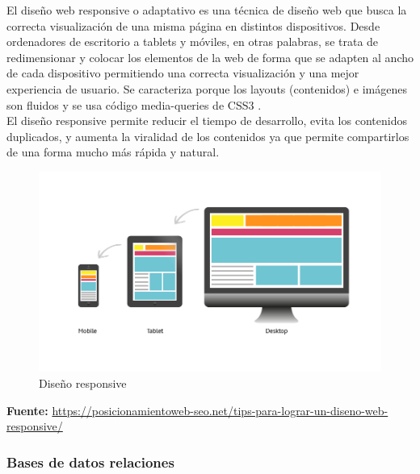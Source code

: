 		{El diseño web responsive o adaptativo es una técnica de diseño web que busca la correcta visualización de una misma página en distintos dispositivos. Desde ordenadores de escritorio a tablets y móviles, en otras palabras, se trata de redimensionar y colocar los elementos de la web de forma que se adapten al ancho de cada dispositivo permitiendo una correcta visualización y una mejor experiencia de usuario. Se caracteriza porque los layouts (contenidos) e imágenes son fluidos y se usa código media-queries de CSS3 \cite{responsive}.\\
			
		El diseño responsive permite reducir el tiempo de desarrollo, evita los contenidos duplicados, y aumenta la viralidad de los contenidos ya que permite compartirlos de una forma mucho más rápida y natural.
	
		\begin{figure}[H]
			\centering
			\includegraphics[width=0.8\linewidth]{description/framework/responsive.jpg}
			\caption{Diseño responsive}
		\end{figure}
		\begin{center}
			\textbf{Fuente:} \url{https://posicionamientoweb-seo.net/tips-para-lograr-un-diseno-web-responsive/}
		\end{center}
		}
			
		
		\subsubsection{Bases de datos relaciones}
		
